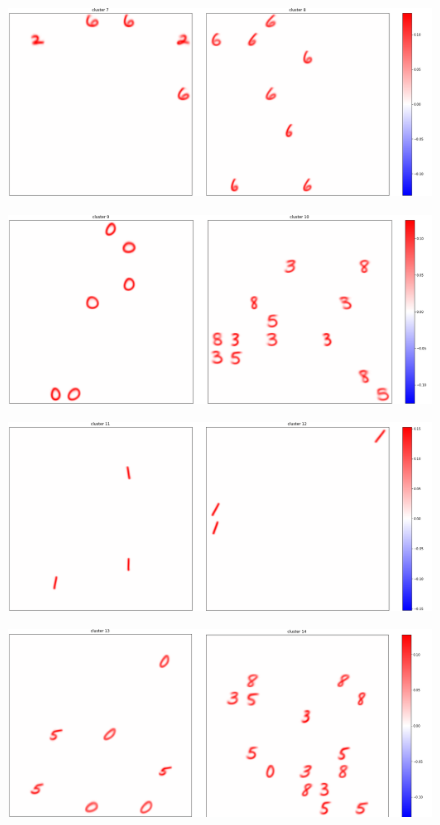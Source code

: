 \documentclass[a4paper]{report}
\begin{document}
\begin{figure} [H]
    \centering
    \includegraphics [width=\textwidth ] {c/e/7.png}
    \caption{}
\end{figure}

\begin{figure} [H]
    \centering
    \includegraphics [width=\textwidth ] {c/e/9.png}
    \caption{}
\end{figure}

\begin{figure} [H]
    \centering
    \includegraphics [width=\textwidth ] {c/e/11.png}
    \caption{}
\end{figure}

\begin{figure} [H]
    \centering
    \includegraphics [width=\textwidth ] {c/e/13.png}
    \caption{}
\end{figure}
\end{document}
